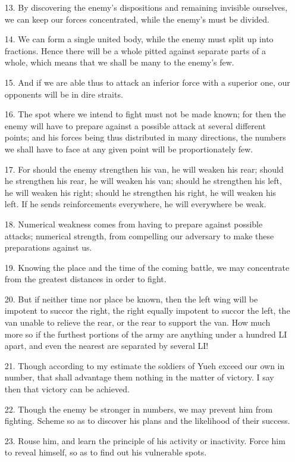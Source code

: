\documentclass[11pt,openany]{memoir}
\newcommand{\enumeratemargin}{1.30em}
\begin{document}
\begin{enumerate}[leftmargin=\enumeratemargin]
\item[13.] By discovering the enemy's dispositions and remaining invisible ourselves, we can keep our forces concentrated, while the enemy's must be divided.
\item[14.] We can form a single united body, while the enemy must split up into fractions. Hence there will be a whole pitted against separate parts of a whole, which means that we shall be many to the enemy's few.
\item[15.] And if we are able thus to attack an inferior force with a superior one, our opponents will be in dire straits.
\item[16.] The spot where we intend to fight must not be made known; for then the enemy will have to prepare against a possible attack at several different points; and his forces being thus distributed in many directions, the numbers we shall have to face at any given point will be proportionately few.
\item[17.] For should the enemy strengthen his van, he will weaken his rear; should he strengthen his rear, he will weaken his van; should he strengthen his left, he will weaken his right; should he strengthen his right, he will weaken his left. If he sends reinforcements everywhere, he will everywhere be weak.
\item[18.] Numerical weakness comes from having to prepare against possible attacks; numerical strength, from compelling our adversary to make these preparations against us.
\item[19.] Knowing the place and the time of the coming battle, we may concentrate from the greatest distances in order to fight.
\item[20.] But if neither time nor place be known, then the left wing will be impotent to succor the right, the right equally impotent to succor the left, the van unable to relieve the rear, or the rear to support the van. How much more so if the furthest portions of the army are anything under a hundred LI apart, and even the nearest are separated by several LI!
\item[21.] Though according to my estimate the soldiers of Yueh exceed our own in number, that shall advantage them nothing in the matter of victory. I say then that victory can be achieved.
\item[22.] Though the enemy be stronger in numbers, we may prevent him from fighting. Scheme so as to discover his plans and the likelihood of their success.
\item[23.] Rouse him, and learn the principle of his activity or inactivity. Force him to reveal himself, so as to find out his vulnerable spots.

\end{enumerate}
\end{document}
